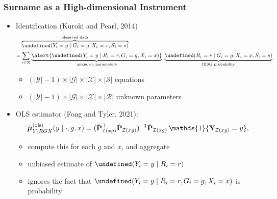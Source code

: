 \documentclass{beamer}
\let\Pr\undefined
\DeclareMathOperator{\Pr}{\mathbb{P}}
\newcommand{\ind}{\mathds{1}}
\newcommand{\cI}{\mathcal{I}}
\begin{document}
\begin{frame}

  \frametitle{Surname as a High-dimensional Instrument}

  \begin{itemize}
  \item Identification {\scriptsize (Kuroki and Pearl, 2014)}
    {\small\begin{align*}
     & \overbrace{\Pr(Y_i=y\mid G_i=g, X_i=x, S_i=s)}^{\text{observed data}} \\
    = & \sum_{r\in\mathcal{R}} \underbrace{\alert{\Pr(Y_i=y\mid R_i=r, G_i=g,
        X_i=x)}}_{\text{unknown parameters}}\ \underbrace{\Pr(R_i=r\mid
        G_i=g, X_i=x, S_i=s)}_{\text{BISG probability}}
           \end{align*}}
    \vspace{-.2in}
         \begin{itemize}
         \item $(|\mathcal{Y}|-1)\times|\mathcal{G}|\times|\mathcal{X}|\times|\mathcal{S}|$ equations
         \item
           $(|\mathcal{Y}|-1)\times|\mathcal{G}|\times|\mathcal{X}|\times|\mathcal{R}|$
           unknown parameters
         \end{itemize}
         \vfill
       \item OLS estimator {\scriptsize (Fong and Tyler, 2021)}:
         $$
    \hat{\vb*\mu}^{(\text{ols})}_{Y\mid RGX}(y\mid \cdot, g,x) 
    =  (\hat{\vb P}_{\cI(xg)}^\top \hat{\vb P}_{\cI(xg)})^{-1}\hat{\vb P}_{\cI(xg)}\,\ind\{{\vb Y}_{\cI(xg)} = y\},
    $$
    \vspace{-.2in}
    \begin{itemize}
    \item compute this for each $g$ and $x$, and aggregate
    \item unbiased estimate of $\Pr(Y_i= y \mid R_i = r)$
    \item ignores the fact that $\Pr(Y_i= y \mid R_i = r, G_i
      = g, X_i = x)$ is probability
  \end{itemize}
  \end{itemize}

\end{frame}
\end{document}
